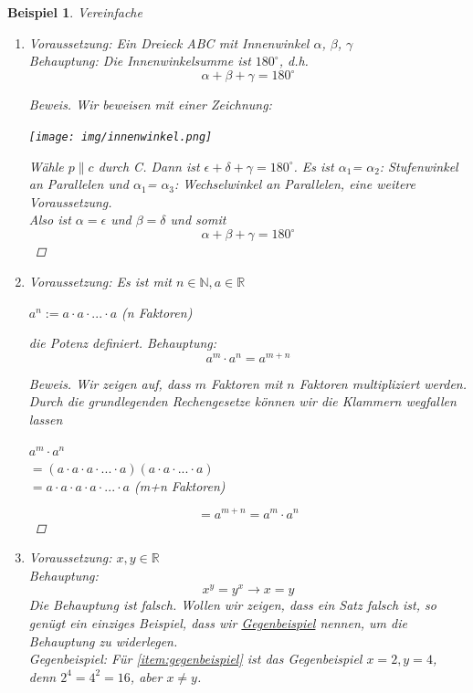 \documentclass{report}
\newtheorem{myexample}{Beispiel}
\begin{document}
\begin{myexample}Vereinfache
\begin{enumerate}
\item Voraussetzung: Ein Dreieck ABC mit Innenwinkel $\alpha$, $\beta$, $\gamma$\\
Behauptung: Die Innenwinkelsumme ist $180^{\circ}$, d.h. 
\begin{equation}\alpha+\beta+\gamma=180^{\circ}\end{equation}
\begin{proof}[Beweis]Wir beweisen mit einer Zeichnung:\begin{center}
\texttt{[image: img/innenwinkel.png]}
\end{center}
Wähle $p \parallel c$ durch C. Dann ist $\epsilon+\delta+\gamma=180^{\circ}$. Es ist $\alpha_1$= $\alpha_2$: Stufenwinkel an Parallelen und $\alpha_1$= $\alpha_3$: Wechselwinkel an Parallelen, eine weitere Voraussetzung.\\
Also ist $\alpha = \epsilon$ und $\beta = \delta$
und somit
\begin{equation}\alpha+\beta+\gamma=180^{\circ}\end{equation}
\end{proof}
\item Voraussetzung: Es ist mit $n \in \mathbb{N}, a \in \mathbb{R}$
\begin{center}$a^n := a \cdot a \cdot ... \cdot a$ (n Faktoren)\end{center}
die Potenz definiert.
Behauptung: \begin{equation}a^m \cdot a^n = a^{m+n}\end{equation}
\begin{proof}[Beweis]Wir zeigen auf, dass $m$ Faktoren mit $n$ Faktoren multipliziert werden. Durch die grundlegenden Rechengesetze können wir die Klammern wegfallen lassen
\begin{center}$a^m \cdot a^n$\\
$= (a \cdot a \cdot a \cdot ... \cdot a)(a \cdot a \cdot ... \cdot a)$\\
$= a \cdot a \cdot a \cdot a \cdot ... \cdot a$ (m+n Faktoren)\end{center}
\begin{equation}= a^{m+n} = a^m \cdot a^n\end{equation}
\end{proof}
\item \label{item:gegenbeispiel} Voraussetzung: $x, y \in \mathbb{R}$\\
Behauptung: \begin{equation} x^y = y^x \to x = y\end{equation} 
Die Behauptung ist falsch. Wollen wir zeigen, dass ein Satz falsch ist, so genügt ein einziges Beispiel, dass wir \underline{Gegenbeispiel} nennen, um die Behauptung zu widerlegen.\\
Gegenbeispiel: Für \ref{item:gegenbeispiel} ist das Gegenbeispiel $x=2, y=4$, denn $2^4 = 4^2 = 16$, aber $x \neq y$.
\end{enumerate}
\end{myexample}
\end{document}
